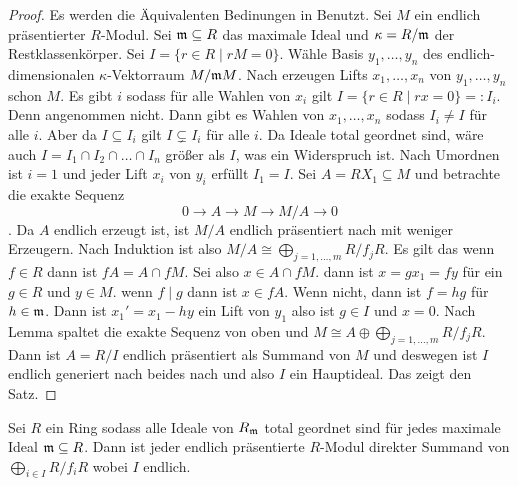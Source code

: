\begin{proof}
    Es werden die Äquivalenten Bedinungen in  Benutzt.
    Sei \(M\) ein endlich präsentierter \(R\)-Modul. Sei \(\mathfrak{m}\subseteq R\) das maximale Ideal und \(\kappa=R/\mathfrak{m}\) der Restklassenkörper. Sei \(I=\{r\in R\mid rM=0\}\). Wähle Basis \(y_1,\dots,y_n\) des endlich-dimensionalen \(\kappa\)-Vektorraum \(M/\mathfrak{m} M\).
    Nach  erzeugen Lifts \(x_1,\dots,x_n\) von \(y_1,\dots,y_n\) schon \(M\).
    Es gibt \(i\) sodass für alle Wahlen von \(x_i\) gilt \(I=\{r\in R\mid rx=0\}=\colon I_i\). Denn angenommen nicht. Dann gibt es Wahlen von \(x_1,\dots,x_n\) sodass \(I_i\neq I\) für alle \(i\). Aber da \(I\subseteq I_i\) gilt \(I\subsetneq I_i\) für alle \(i\). Da Ideale total geordnet sind, wäre auch \(I=I_1\cap I_2\cap\dots\cap I_n\) größer als \(I\), was ein Widerspruch ist. Nach Umordnen ist \(i=1\) und jeder Lift \(x_i\) von \(y_i\) erfüllt \(I_1=I\). Sei \(A=RX_1\subseteq M\) und betrachte die exakte Sequenz 
    \[0\to A\to M\to M/A\to 0\]. Da \(A\) endlich erzeugt ist, ist \(M/A\) endlich präsentiert nach  mit weniger Erzeugern. Nach Induktion ist also \(M/A\cong\bigoplus_{j=1,\dots,m}R/f_jR\). Es gilt das wenn \(f\in R\) dann ist \(fA=A\cap fM\). Sei also \(x\in A\cap fM\). dann ist \(x=gx_1=fy\) für ein \(g\in R\) und \(y\in M\). wenn \(f\mid g\) dann ist \(x\in fA\). Wenn nicht, dann ist \(f=hg\) für \(h\in\mathfrak{m}\). Dann ist \(x_1'=x_1-hy\) ein Lift von \(y_1\) also ist \(g\in I\) und \(x=0\). Nach Lemma  spaltet die exakte Sequenz von oben und \(M\cong A\oplus\bigoplus_{j=1,\dots,m}R/f_jR\). Dann ist \(A=R/I\) endlich präsentiert als Summand von \(M\) und deswegen ist \(I\) endlich generiert nach beides nach  und also \(I\) ein Hauptideal. Das zeigt den Satz.
    
\end{proof}
\begin{Lemma}\label{Lem:IdealTotOrdDirSum}
    Sei \(R\) ein Ring sodass alle Ideale von \(R_{\mathfrak{m}}\) total geordnet sind für jedes maximale Ideal \(\mathfrak{m}\subseteq R\). Dann ist jeder endlich präsentierte \(R\)-Modul direkter Summand von \(\bigoplus_{i\in I}R/f_iR\) wobei \(I\) endlich.
\end{Lemma}
